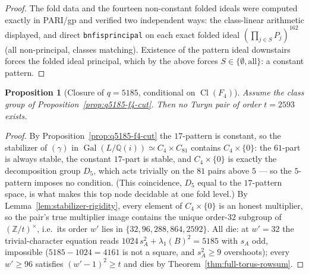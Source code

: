 \documentclass[11pt]{article}
\theoremstyle{plain}
\newtheorem{proposition}[theorem]{Proposition}
\theoremstyle{definition}
\theoremstyle{remark}
\newcommand{\Z}{\mathbb Z}
\newcommand{\Q}{\mathbb Q}
\newcommand{\Cl}{\operatorname{Cl}}
\newcommand{\Gal}{\operatorname{Gal}}
\begin{document}
\begin{proof}
The fold data and the fourteen non-constant folded ideals were computed
exactly in PARI/gp and verified two independent ways: the class-linear
arithmetic displayed, and direct \texttt{bnfisprincipal} on each exact
folded ideal $(\prod_{j\in S}P_j)^{162}$ (all non-principal, classes
matching).  Existence of the pattern ideal downstairs forces the folded
ideal principal, which by the above forces $S\in\{\emptyset,\text{all}\}$:
a constant pattern.
\end{proof}

\begin{proposition}[Closure of $q=5185$, conditional on $\Cl(F_4)$]
\label{prop:q5185-closure}
Assume the class group of Proposition~\ref{prop:q5185-f4-cut}.  Then no
Turyn pair of order $t=2593$ exists.
\end{proposition}

\begin{proof}
By Proposition~\ref{prop:q5185-f4-cut} the $17$-pattern is constant, so
the stabilizer of $(\gamma)$ in $\Gal(L/\Q(i))\simeq C_4\times C_{81}$
contains $C_4\times\{0\}$: the $61$-part is always stable, the constant
$17$-part is stable, and $C_4\times\{0\}$ is exactly the decomposition
group $D_5$, which acts trivially on the $81$ pairs above $5$ --- so the
$5$-pattern imposes no condition.  (This coincidence, $D_5$ equal to the
$17$-pattern space, is what makes this top node decidable at one fold
level.)  By Lemma~\ref{lem:stabilizer-rigidity}, every element of
$C_4\times\{0\}$ is an honest multiplier, so the pair's true multiplier
image contains the unique order-$32$ subgroup of $(\Z/t)^\times$, i.e.\
its order $w'$ lies in $\{32,96,288,864,2592\}$.  All die: at $w'=32$
the trivial-character equation reads $1024\,s_A^2+\lambda_1(B)^2=5185$
with $s_A$ odd, impossible ($5185-1024=4161$ is not a square, and
$s_A^2\ge9$ overshoots); every $w'\ge96$ satisfies $(w'-1)^2\ge t$ and
dies by Theorem~\ref{thm:full-torus-rowsum}.
\end{proof}
\end{document}

